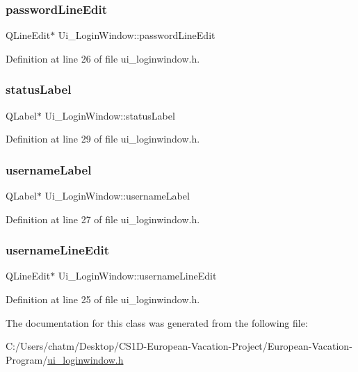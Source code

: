 \subsubsection{\texorpdfstring{passwordLineEdit}{passwordLineEdit}}
{\footnotesize\ttfamily Q\+Line\+Edit$\ast$ Ui\+\_\+\+Login\+Window\+::password\+Line\+Edit}



Definition at line 26 of file ui\+\_\+loginwindow.\+h.

\mbox{\label{class_ui___login_window_abdb557fde6663074faa84b449bb2eddc}} 
\subsubsection{\texorpdfstring{statusLabel}{statusLabel}}
{\footnotesize\ttfamily Q\+Label$\ast$ Ui\+\_\+\+Login\+Window\+::status\+Label}



Definition at line 29 of file ui\+\_\+loginwindow.\+h.

\mbox{\label{class_ui___login_window_a9595f2c0be7d47ee8d3de1b795d6946d}} 
\subsubsection{\texorpdfstring{usernameLabel}{usernameLabel}}
{\footnotesize\ttfamily Q\+Label$\ast$ Ui\+\_\+\+Login\+Window\+::username\+Label}



Definition at line 27 of file ui\+\_\+loginwindow.\+h.

\mbox{\label{class_ui___login_window_a5f0e5d18fc9c536647aed75348b1305f}} 
\subsubsection{\texorpdfstring{usernameLineEdit}{usernameLineEdit}}
{\footnotesize\ttfamily Q\+Line\+Edit$\ast$ Ui\+\_\+\+Login\+Window\+::username\+Line\+Edit}



Definition at line 25 of file ui\+\_\+loginwindow.\+h.



The documentation for this class was generated from the following file\+:\begin{DoxyCompactItemize}
\item 
C\+:/\+Users/chatm/\+Desktop/\+C\+S1\+D-\/\+European-\/\+Vacation-\/\+Project/\+European-\/\+Vacation-\/\+Program/\mbox{\hyperlink{ui__loginwindow_8h}{ui\+\_\+loginwindow.\+h}}\end{DoxyCompactItemize}
